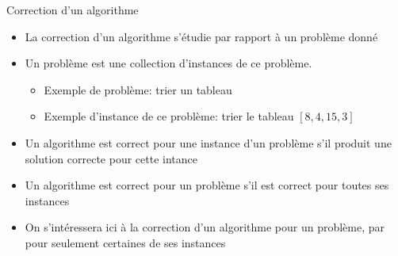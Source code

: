 \begin{frame}{Correction d'un algorithme}%

\begin{itemize}
\item La correction d'un algorithme s'étudie par rapport à un problème donné
\item Un problème est une collection d'instances de ce problème.
\begin{itemize}
\item Exemple de problème: trier un tableau
\item Exemple d'instance de ce problème: trier le tableau $[8,4,15,3]$
\end{itemize}
\item Un algorithme est correct pour une instance d'un problème s'il
  produit une solution correcte pour cette intance
\item Un algorithme est correct pour un problème s'il est correct pour
  toutes ses instances
\item On s'intéressera ici à la correction d'un algorithme pour un
  problème, par pour seulement certaines de ses instances
\end{itemize}

\note{}

\end{frame}

